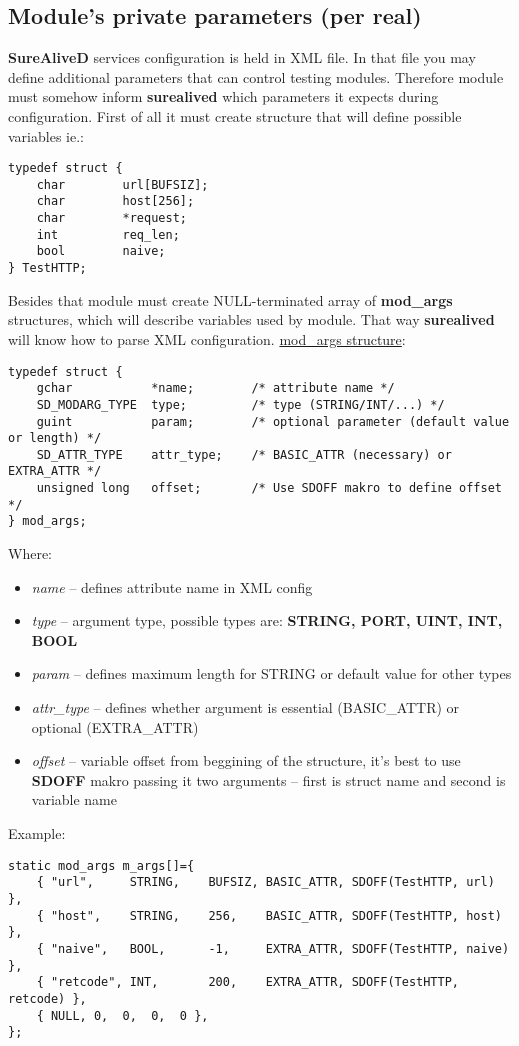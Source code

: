 \documentclass[polish,12pt]{article}
\begin{document}
\subsection{Module's private parameters (per real)}
\textbf{SureAliveD} services configuration is held in XML file.
In that file you may define additional parameters that can control testing modules.
Therefore module must somehow inform \textbf{surealived} which parameters it expects
during configuration. First of all it must create structure that will define possible
variables ie.:
{\small
\begin{verbatim}
typedef struct {
    char        url[BUFSIZ];
    char        host[256];
    char        *request;
    int         req_len;
    bool        naive;
} TestHTTP;
\end{verbatim}
}
\newpage
Besides that module must create NULL-terminated array of \textbf{mod\_args} structures,
which will describe variables used by module. That way \textbf{surealived} will know
how to parse XML configuration.\newline
\underline{mod\_args structure}:
{\small
\begin{verbatim}
typedef struct {
    gchar           *name;        /* attribute name */
    SD_MODARG_TYPE  type;         /* type (STRING/INT/...) */
    guint           param;        /* optional parameter (default value or length) */
    SD_ATTR_TYPE    attr_type;    /* BASIC_ATTR (necessary) or EXTRA_ATTR */
    unsigned long   offset;       /* Use SDOFF makro to define offset */
} mod_args;
\end{verbatim}
}
Where:
\begin{itemize}
  \item \textit{name} -- defines attribute name in XML config
  \item \textit{type} -- argument type, possible types are: \textbf{STRING, PORT, UINT, INT, BOOL}
  \item \textit{param} -- defines maximum length for STRING or default value for other types
  \item \textit{attr\_type} -- defines whether argument is essential (BASIC\_ATTR) or optional (EXTRA\_ATTR)
  \item \textit{offset} -- variable offset from beggining of the structure, it's best to use
    \textbf{SDOFF} makro passing it two arguments -- first is struct name and second is variable name
\end{itemize}
Example:
{\small
\begin{verbatim}
static mod_args m_args[]={
    { "url",     STRING,    BUFSIZ, BASIC_ATTR, SDOFF(TestHTTP, url)     },
    { "host",    STRING,    256,    BASIC_ATTR, SDOFF(TestHTTP, host)    },
    { "naive",   BOOL,      -1,     EXTRA_ATTR, SDOFF(TestHTTP, naive)   },
    { "retcode", INT,       200,    EXTRA_ATTR, SDOFF(TestHTTP, retcode) },
    { NULL, 0,  0,  0,  0 },
};
\end{verbatim}
}
\end{document}
